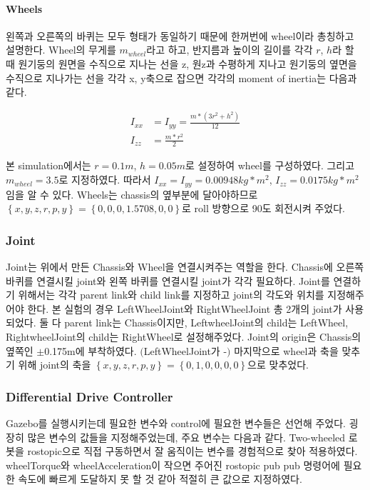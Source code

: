 \documentclass{article}
\begin{document}
\paragraph{Wheels}

왼쪽과 오른쪽의 바퀴는 모두 형태가 동일하기 때문에 한꺼번에 wheel이라 총칭하고 설명한다. Wheel의 무게를 $m_{wheel}$라고 하고, 반지름과 높이의 길이를 각각 $r$, $h$라 할 때 원기둥의 원면을 수직으로 지나는 선을 z, 원z과 수평하게 지나고 원기둥의 옆면을 수직으로 지나가는 선을 각각 x, y축으로 잡으면 각각의 moment of inertia는 다음과 같다.

\begin{align}
I_{xx} & = I_{yy} = \frac{m*(3r^2 + h^2)}{12} \\ 
I_{zz} & =\frac{m*r^2}{2} 
\end{align}

본 simulation에서는 $r=0.1m$, $h=0.05m$로 설정하여 wheel를 구성하였다. 그리고 $m_{wheel}=3.5$로 지정하였다. 따라서 $I_{xx}=I_{yy}=0.00948kg*m^{2}$, $I_{zz}=0.0175kg*m^{2}$임을 알 수 있다. Wheels는 chassis의 옆부분에 달아야하므로 $\left\{x, y, z, r, p, y\right\}=\left\{0, 0, 0, 1.5708, 0, 0\right\}$로 roll 방향으로 90도 회전시켜 주었다.

\subsubsection{Joint}

Joint는 위에서 만든 Chassis와 Wheel을 연결시켜주는 역할을 한다. Chassis에 오른쪽 바퀴를 연결시킬 joint와 왼쪽 바퀴를 연결시킬 joint가 각각 필요하다. Joint를 연결하기 위해서는 각각 parent link와 child link를 지정하고 joint의 각도와 위치를 지정해주어야 한다. 본 실험의 경우 LeftWheelJoint와 RightWheelJoint 총 2개의 joint가 사용되었다. 둘 다 parent link는 Chassis이지만, LeftwheelJoint의 child는 LeftWheel, RightwheelJoint의 child는 RightWheel로 설정해주었다. Joint의 origin은 Chassis의 옆쪽인 $\pm$0.175m에 부착하였다. $($LeftWheelJoint가 -$)$ 마지막으로 wheel과 축을 맞추기 위해 joint의 축을 $\left\{x, y, z, r, p, y\right\}=\left\{0, 1, 0, 0, 0, 0\right\}$으로 맞추었다.


\subsubsection{Differential Drive Controller}

Gazebo를 실행시키는데 필요한 변수와 control에 필요한 변수들은 선언해 주었다. 굉장히 많은 변수의 값들을 지정해주었는데, 주요 변수는 다음과 같다. Two-wheeled 로봇을 rostopic으로 직접 구동하면서 잘 움직이는 변수를 경험적으로 찾아 적용하였다. wheelTorque와 wheelAcceleration이 작으면 주어진 rostopic pub pub 명령어에 필요한 속도에 빠르게 도달하지 못 할 것 같아 적절히 큰 값으로 지정하였다. 
\end{document}
